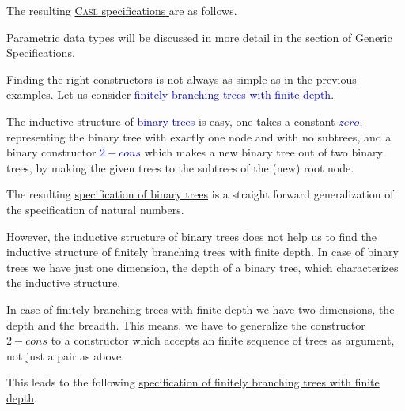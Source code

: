 \documentclass[landscape, autoslides, light]{mmiss}
\newcommand{\CASL}{\textmd{\textsc{Casl}}\xspace }
\begin{document}
\begin{Package}[Label={FSDPT}, Title={Formal Specification of Data and Process Types}, ShortTitle={FSDPT}, Authors={Horst Reichel}, Date={February 2003}, LevelOfDetail=Lecture, Language=en-GB]
\begin{Section}[Title={Initial Algebras as Data Types}, Label={section3}]
\begin{Section}[Title={Initial Specifications of Data Types}, Label={section3_2}]
\begin{Paragraph}[Title={Examples}, Label=Paragraph42]
The resulting \hyperlink{nat-casl}{\CASL specifications } are as
follows.


\end{Paragraph}
\begin{Paragraph}[Title={Examples}, Label=Paragraph43]

Parametric data types will be discussed in more detail in the
section of Generic Specifications.


\end{Paragraph}
\begin{Paragraph}[Title={Examples}, Label=Paragraph44]

Finding the right constructors is not always as simple as in the
previous examples. Let us consider \textcolor{blue}{finitely
branching trees with finite depth}.

The inductive structure of \textcolor{blue}{binary trees} is easy,
one takes a constant \textcolor{blue}{$zero$}, representing the
binary tree with exactly one node and with no subtrees, and a
binary constructor \textcolor{blue}{$2-cons$} which makes a new
binary tree out of two binary trees, by making the given trees to
the subtrees of the (new) root node.

The resulting \hyperlink{2-trees}{specification of binary trees}
is a straight forward generalization of the specification of
natural numbers.


\end{Paragraph}
\begin{Paragraph}[Title={Examples}, Label=Paragraph45]

However, the inductive structure of binary trees does not help us
to find the inductive structure of finitely branching trees with
finite depth. In case of binary trees we have just one dimension,
the depth of a binary tree, which characterizes the inductive
structure.

In case of finitely branching trees with finite depth we have two
dimensions, the depth and the breadth. This means, we have to
generalize the constructor $2-cons$ to a constructor which accepts
an finite sequence of trees as argument, not just a pair as above.

This leads to the following \hyperlink{trees}{specification of
finitely branching trees with finite depth}.


\end{Paragraph}
\end{Section}
\end{Section}
\end{Package}
\end{document}
